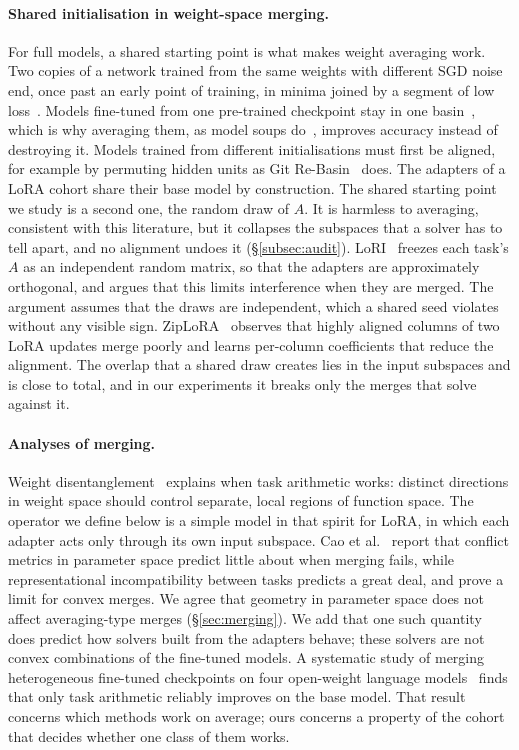 \paragraph{Shared initialisation in weight-space merging.} For full models, a
shared starting point is what makes weight averaging work. Two copies of a
network trained from the same weights with different SGD noise end, once past
an early point of training, in minima joined by a segment of low
loss~\citep{frankle2020lmc}. Models fine-tuned from one pre-trained checkpoint
stay in one basin~\citep{neyshabur2020transfer}, which is why averaging them,
as model soups do~\citep{wortsman2022soups}, improves accuracy instead of
destroying it. Models trained from different initialisations must first be
aligned, for example by permuting hidden units as Git
Re-Basin~\citep{ainsworth2023rebasin} does. The adapters of a LoRA cohort
share their base model by construction. The shared starting point we study is
a second one, the random draw of $A$. It is harmless to averaging, consistent
with this literature, but it collapses the subspaces that a solver has to tell
apart, and no alignment undoes it (\S\ref{subsec:audit}).
LoRI~\citep{zhang2025lori} freezes each task's $A$ as an independent random
matrix, so that the adapters are approximately orthogonal, and argues that
this limits interference when they are merged. The argument assumes that the
draws are independent, which a shared seed violates without any visible sign.
ZipLoRA~\citep{shah2024ziplora} observes that highly aligned columns of two
LoRA updates merge poorly and learns per-column coefficients that reduce the
alignment. The overlap that a shared draw creates lies in the input subspaces
and is close to total, and in our experiments it breaks only the merges that
solve against it.

\paragraph{Analyses of merging.} Weight
disentanglement~\citep{ortizjimenez2023disentanglement} explains when task
arithmetic works: distinct directions in weight space should control separate,
local regions of function space. The operator we define below is a simple
model in that spirit for LoRA, in which each adapter acts only through its own
input subspace. Cao et al.~\citep{cao2026collapse} report that conflict
metrics in parameter space predict little about when merging fails, while
representational incompatibility between tasks predicts a great deal, and
prove a limit for convex merges. We agree that geometry in parameter space
does not affect averaging-type merges (\S\ref{sec:merging}). We add that one
such quantity does predict how solvers built from the adapters behave; these
solvers are not convex combinations of the fine-tuned models. A systematic
study of merging heterogeneous fine-tuned checkpoints on four open-weight
language models~\citep{systematic2025merging} finds that only task arithmetic
reliably improves on the base model. That result concerns which methods work
on average; ours concerns a property of the cohort that decides whether one
class of them works.

